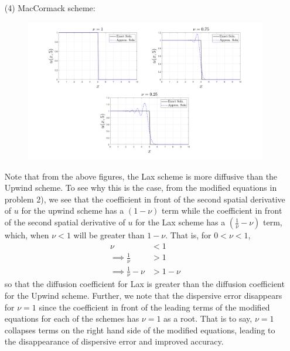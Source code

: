 \documentclass{article}
\begin{document}
\begin{itemize}
\begin{itemize}
        \item[(4)] MacCormack scheme:
        \newline\newline
        \begin{figure}[H]
            \begin{center}
                \includegraphics[scale = 0.25]{prob_3_maccormack_subplots.png}
            \end{center}
        \end{figure}
        Note that from the above figures, the Lax scheme is more diffusive than the Upwind scheme. To see why this is the case, from the modified equations in problem 2), we see that the coefficient in front of the second spatial derivative of $u$ for the upwind scheme has a $(1 - \nu)$ term while the coefficient in front of the second spatial derivative of $u$ for the Lax scheme has a $\left(\frac{1}{\nu} - \nu\right)$ term, which, when $\nu < 1$ will be greater than $1 - \nu$. That is, for $0 < \nu < 1$,
        \begin{align*}
            \nu &< 1\\
            \implies \frac{1}{\nu} &> 1\\
            \implies \frac{1}{\nu} - \nu &> 1 - \nu
        \end{align*}
        so that the diffusion coefficient for Lax is greater than the diffusion coefficient for the Upwind scheme. Further, we note that the dispersive error disappears for $\nu = 1$ since the coefficient in front of the leading terms of the modified equations for each of the schemes has $\nu = 1$ as a root. That is to say, $\nu = 1$ collapses terms on the right hand side of the modified equations, leading to the disappearance of dispersive error and improved accuracy.
    \end{itemize}
\end{itemize}
\end{document}
